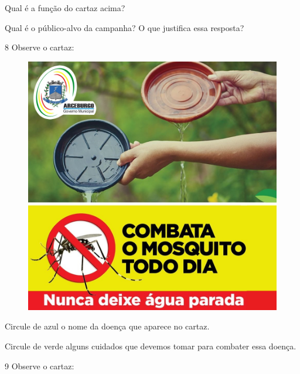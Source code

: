 \begin{escolha}
\item Qual é a função do cartaz acima?\\

\item Qual é o público-alvo da campanha? O que justifica essa resposta?\\
\end{escolha}

\num{8} Observe o cartaz:

\begin{figure}[H]
\centering
\includegraphics[width=.8\textwidth]{media/image134.jpg}
\end{figure}


\begin{escolha}
\item Circule de azul o nome da doença que aparece no cartaz.

\item Circule de verde alguns cuidados que devemos tomar para combater essa doença.
\end{escolha}

\num{9} Observe o cartaz:

